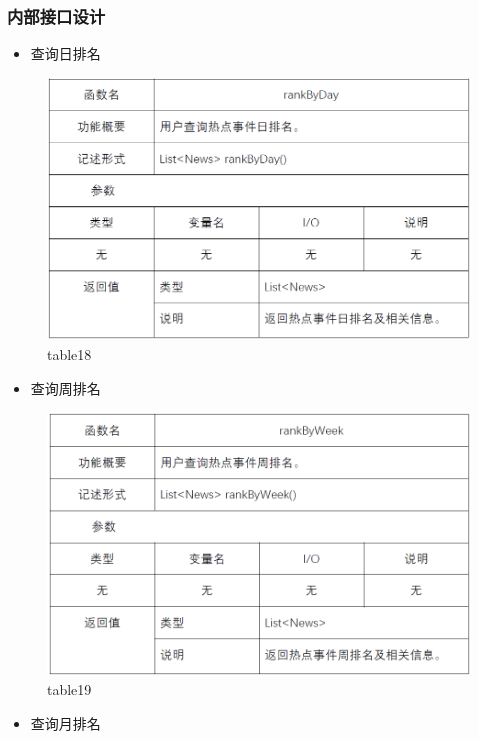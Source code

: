 \subsubsection{内部接口设计}
\begin{itemize}
	\item 查询日排名
\end{itemize}
\begin{figure}[!htbp]
	\centering
	\includegraphics[scale=0.7]{image/b18.png} %
	\caption{table18} %
\end{figure}
\begin{itemize}
	\item 查询周排名
\end{itemize}
\begin{figure}[!htbp]
	\centering
	\includegraphics[scale=0.7]{image/b19.png} %
	\caption{table19} %
\end{figure}
\begin{itemize}
	\item 查询月排名
\end{itemize}

